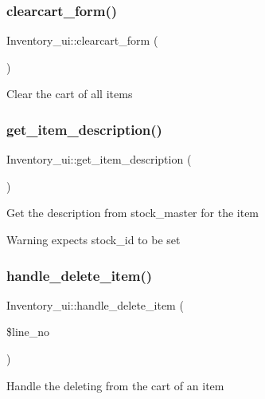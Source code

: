 \subsubsection{\texorpdfstring{clearcart\+\_\+form()}{clearcart\_form()}}
{\footnotesize\ttfamily Inventory\+\_\+ui\+::clearcart\+\_\+form (\begin{DoxyParamCaption}{ }\end{DoxyParamCaption})}

Clear the cart of all items \hypertarget{class_inventory__ui_a37a17c8d4b2d63c774dc3404754df4f4}{}\label{class_inventory__ui_a37a17c8d4b2d63c774dc3404754df4f4} 
\subsubsection{\texorpdfstring{get\+\_\+item\+\_\+description()}{get\_item\_description()}}
{\footnotesize\ttfamily Inventory\+\_\+ui\+::get\+\_\+item\+\_\+description (\begin{DoxyParamCaption}{ }\end{DoxyParamCaption})}

Get the description from stock\+\_\+master for the item \begin{DoxyWarning}{Warning}
expects stock\+\_\+id to be set 
\end{DoxyWarning}
\hypertarget{class_inventory__ui_aaa12492aec2f41782ca4467e2d0bb8c1}{}\label{class_inventory__ui_aaa12492aec2f41782ca4467e2d0bb8c1} 
\subsubsection{\texorpdfstring{handle\+\_\+delete\+\_\+item()}{handle\_delete\_item()}}
{\footnotesize\ttfamily Inventory\+\_\+ui\+::handle\+\_\+delete\+\_\+item (\begin{DoxyParamCaption}\item[{}]{\$line\+\_\+no }\end{DoxyParamCaption})}

Handle the deleting from the cart of an item \hypertarget{class_inventory__ui_abd5a2b4048e33b9c1518db7c44115f4f}{}\label{class_inventory__ui_abd5a2b4048e33b9c1518db7c44115f4f} 
